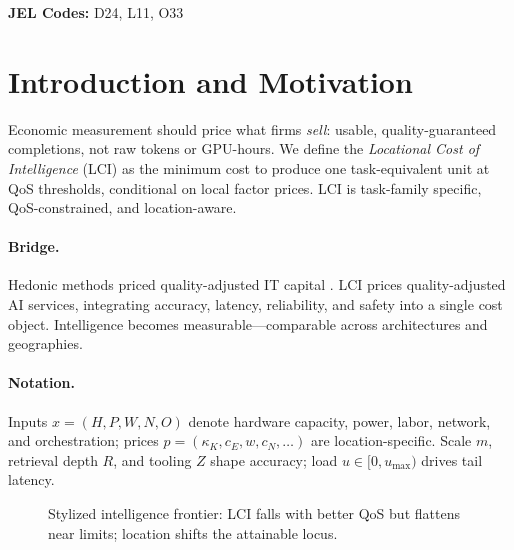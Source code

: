 \documentclass[12pt]{article}
\numberwithin{equation}{section}
\begin{document}
\vspace{0.3cm}
\noindent\textbf{JEL Codes:} D24, L11, O33

\newpage

\section{Introduction and Motivation}

Economic measurement should price what firms \emph{sell}: usable, quality-guaranteed completions, not raw tokens or GPU-hours.  
We define the \emph{Locational Cost of Intelligence} (LCI) as the minimum cost to produce one task-equivalent unit at QoS thresholds, conditional on local factor prices.  
LCI is task-family specific, QoS-constrained, and location-aware.

\paragraph{Bridge.}
Hedonic methods priced quality-adjusted IT capital \citep{Triplett1989,Pakes2003,Byrne2017}.  
LCI prices quality-adjusted AI services, integrating accuracy, latency, reliability, and safety into a single cost object.  
Intelligence becomes measurable—comparable across architectures and geographies.

\paragraph{Notation.}
Inputs $x=(H,P,W,N,O)$ denote hardware capacity, power, labor, network, and orchestration; prices $p=(\kappa_K,c_E,w,c_N,\dots)$ are location-specific.  
Scale $m$, retrieval depth $R$, and tooling $Z$ shape accuracy; load $u\in[0,u_{\max})$ drives tail latency.

\begin{figure}[t]
\centering
{}
\caption{Stylized intelligence frontier: LCI falls with better QoS but flattens near limits; location shifts the attainable locus.}
\label{fig:frontier}
\end{figure}
\end{document}
